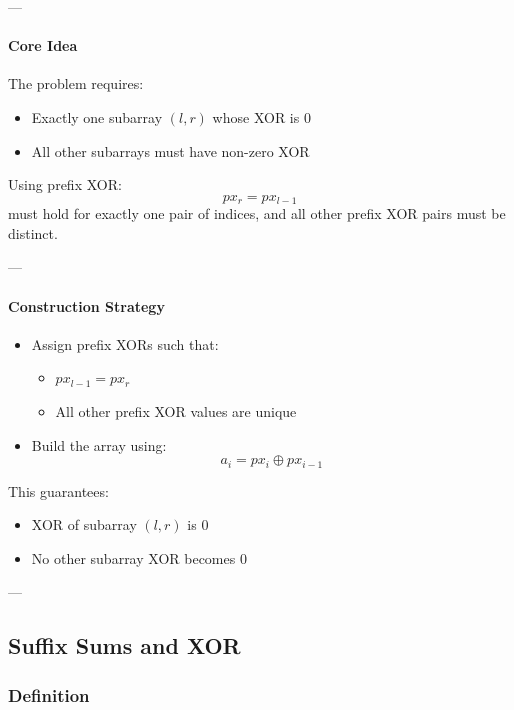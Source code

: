 \documentclass[11pt]{article}
\begin{document}
---

\paragraph{Core Idea}

The problem requires:
\begin{itemize}
    \item Exactly one subarray $(l, r)$ whose XOR is $0$
    \item All other subarrays must have non-zero XOR
\end{itemize}

Using prefix XOR:
\[
px_r = px_{l-1}
\]
must hold for exactly one pair of indices, and all other prefix XOR pairs
must be distinct.

---

\paragraph{Construction Strategy}

\begin{itemize}
    \item Assign prefix XORs such that:
    \begin{itemize}
        \item $px_{l-1} = px_r$
        \item All other prefix XOR values are unique
    \end{itemize}
    \item Build the array using:
    \[
    a_i = px_i \oplus px_{i-1}
    \]
\end{itemize}

This guarantees:
\begin{itemize}
    \item XOR of subarray $(l, r)$ is $0$
    \item No other subarray XOR becomes $0$
\end{itemize}

---


\subsection{Suffix Sums and XOR}

\subsubsection{Definition}
\end{document}
